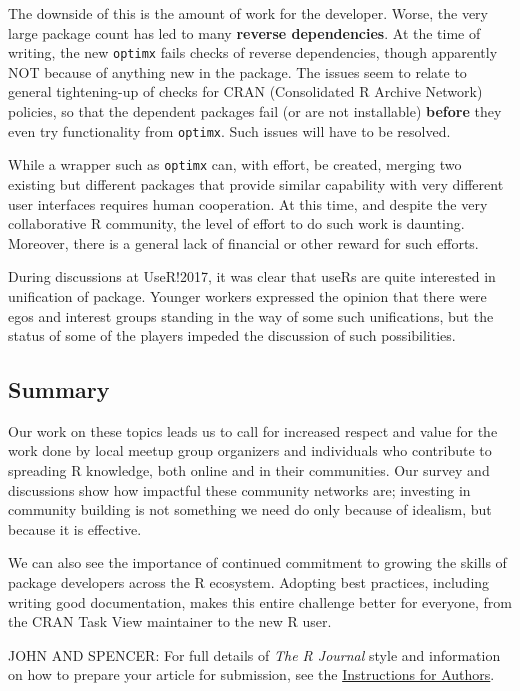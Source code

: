 The downside of this is the amount of work for the developer. Worse, the
very large package count has led to many \textbf{reverse dependencies}.
At the time of writing, the new \texttt{optimx} fails checks of reverse
dependencies, though apparently NOT because of anything new in the
package. The issues seem to relate to general tightening-up of checks
for CRAN (Consolidated R Archive Network) policies, so that the
dependent packages fail (or are not installable) \textbf{before} they
even try functionality from \texttt{optimx}. Such issues will have to be
resolved.

While a wrapper such as \texttt{optimx} can, with effort, be created,
merging two existing but different packages that provide similar
capability with very different user interfaces requires human
cooperation. At this time, and despite the very collaborative R
community, the level of effort to do such work is daunting. Moreover,
there is a general lack of financial or other reward for such efforts.

During discussions at UseR!2017, it was clear that useRs are quite
interested in unification of package. Younger workers expressed the
opinion that there were egos and interest groups standing in the way of
some such unifications, but the status of some of the players impeded
the discussion of such possibilities.

\hypertarget{summary}{%
\subsection{Summary}\label{summary}}

Our work on these topics leads us to call for increased respect and
value for the work done by local meetup group organizers and individuals
who contribute to spreading R knowledge, both online and in their
communities. Our survey and discussions show how impactful these
community networks are; investing in community building is not something
we need do only because of idealism, but because it is effective.

We can also see the importance of continued commitment to growing the
skills of package developers across the R ecosystem. Adopting best
practices, including writing good documentation, makes this entire
challenge better for everyone, from the CRAN Task View maintainer to the
new R user.

JOHN AND SPENCER: For full details of \emph{The R Journal} style and
information on how to prepare your article for submission, see the
\href{https://journal.r-project.org/share/author-guide.pdf}{Instructions
for Authors}.

